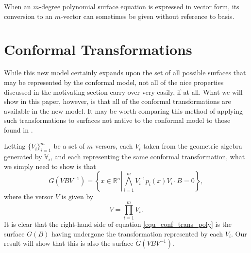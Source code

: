 \documentclass{birkjour}
\theoremstyle{definition}
\theoremstyle{remark}
\numberwithin{equation}{section}
\newcommand{\R}{\mathbb{R}}
\newcommand{\V}{\mathbb{V}}
\newcommand{\Gd}{\dot{G}}
\begin{document}
When an $m$-degree polynomial surface equation is expressed in vector form, its conversion to an $m$-vector
can sometimes be given without reference to basis.

\section{Conformal Transformations}

While this new model certainly expands upon the set of all possible surfaces that may
be represented by
the conformal model, not all of the nice properties discussed in the motivating section
carry over very easily, if at all.
What we will show in this paper, however, is that all of the conformal transformations
are available in the new model.  It may be worth comparing this method
of applying such transformations to surfaces not native to the conformal model
to those found in \cite{Sobczyk12,Lasenby05}.

Letting $\{V_i\}_{i=1}^m$ be a set of $m$ versors, each $V_i$ taken from the
geometric algebra generated by $\V_i$, and each representing the same
conformal transformation, what we simply need to show is that
\begin{equation}\label{equ_conf_trans_poly}
\Gd(VBV^{-1}) = \left\{x\in\R^n\left|\bigwedge_{i=1}^m V_i^{-1}p_i(x)V_i\cdot B=0\right\}\right.,
\end{equation}
where the versor $V$ is given by
\begin{equation*}
V = \prod_{i=1}^m V_i.
\end{equation*}
It is clear that the right-hand side of equation \eqref{equ_conf_trans_poly} is
the surface $\Gd(B)$ having undergone the transformation represented by each $V_i$.
Our result will show that this is also the surface $\Gd(VBV^{-1})$.
\end{document}
